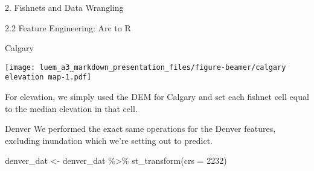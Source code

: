 \documentclass[
  ignorenonframetext,
]{beamer}
\newenvironment{Shaded}{\begin{snugshade}}{\end{snugshade}}
\newcommand{\AttributeTok}[1]{\textcolor[rgb]{0.77,0.63,0.00}{#1}}
\newcommand{\ConstantTok}[1]{\textcolor[rgb]{0.00,0.00,0.00}{#1}}
\newcommand{\DecValTok}[1]{\textcolor[rgb]{0.00,0.00,0.81}{#1}}
\newcommand{\FloatTok}[1]{\textcolor[rgb]{0.00,0.00,0.81}{#1}}
\newcommand{\FunctionTok}[1]{\textcolor[rgb]{0.00,0.00,0.00}{#1}}
\newcommand{\NormalTok}[1]{#1}
\newcommand{\OtherTok}[1]{\textcolor[rgb]{0.56,0.35,0.01}{#1}}
\newcommand{\SpecialCharTok}[1]{\textcolor[rgb]{0.00,0.00,0.00}{#1}}
\newcommand{\StringTok}[1]{\textcolor[rgb]{0.31,0.60,0.02}{#1}}
\begin{document}
\begin{frame}[fragile]{2. Fishnets and Data Wrangling}
\begin{block}{2.2 Feature Engineering: Arc to R}
\begin{block}{Calgary}
\begin{Shaded}
\end{Shaded}

\texttt{[image: luem\_a3\_markdown\_presentation\_files/figure-beamer/calgary elevation map-1.pdf]}

For elevation, we simply used the DEM for Calgary and set each fishnet
cell equal to the median elevation in that cell.
\end{block}

\begin{block}{Denver}
\protect\hypertarget{denver}{}
We performed the exact same operations for the Denver features,
excluding inundation which we're setting out to predict.

\begin{Shaded}
\begin{Highlighting}[]
\NormalTok{denver\_dat }\OtherTok{\textless{}{-}}\NormalTok{ denver\_dat }\SpecialCharTok{\%\textgreater{}\%}
  \FunctionTok{st\_transform}\NormalTok{(}\AttributeTok{crs =} \DecValTok{2232}\NormalTok{)}
\end{Highlighting}
\end{Shaded}


\end{block}
\end{block}
\end{frame}
\end{document}
